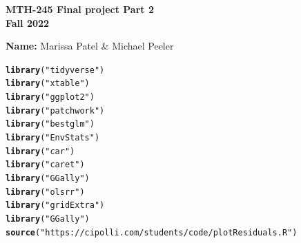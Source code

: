 \documentclass{article}\usepackage[]{graphicx}\usepackage[]{xcolor}
\makeatletter
\newcommand{\hlstr}[1]{\textcolor[rgb]{0.192,0.494,0.8}{#1}}%
\newcommand{\hlstd}[1]{\textcolor[rgb]{0.345,0.345,0.345}{#1}}%
\newcommand{\hlkwd}[1]{\textcolor[rgb]{0.737,0.353,0.396}{\textbf{#1}}}%
\newenvironment{kframe}{%
 \def\at@end@of@kframe{}%
 \ifinner\ifhmode%
  \def\at@end@of@kframe{\end{minipage}}%
  \begin{minipage}{\columnwidth}%
 \fi\fi%
 \def\FrameCommand##1{\hskip\@totalleftmargin \hskip-\fboxsep
 \colorbox{shadecolor}{##1}\hskip-\fboxsep
     \hskip-\linewidth \hskip-\@totalleftmargin \hskip\columnwidth}%
 \MakeFramed {\advance\hsize-\width
   \@totalleftmargin\z@ \linewidth\hsize
   \@setminipage}}%
 {\par\unskip\endMakeFramed%
 \at@end@of@kframe}
\newenvironment{knitrout}{}{} %
\makeatother
\begin{document}
\begin{center}
\textbf{MTH-245 Final project Part 2} \\
\textbf{Fall 2022}\\
\end{center}

\vspace{.3cm}

\textbf{Name: } Marissa Patel \& Michael Peeler 

\vspace{.3cm}

\begin{knitrout}
\color{fgcolor}\begin{kframe}
\begin{alltt}
\hlkwd{library}\hlstd{(}\hlstr{"tidyverse"}\hlstd{)}
\hlkwd{library}\hlstd{(}\hlstr{"xtable"}\hlstd{)}
\hlkwd{library}\hlstd{(}\hlstr{"ggplot2"}\hlstd{)}
\hlkwd{library}\hlstd{(}\hlstr{"patchwork"}\hlstd{)}
\hlkwd{library}\hlstd{(}\hlstr{"bestglm"}\hlstd{)}
\hlkwd{library}\hlstd{(}\hlstr{"EnvStats"}\hlstd{)}
\hlkwd{library}\hlstd{(}\hlstr{"car"}\hlstd{)}
\hlkwd{library}\hlstd{(}\hlstr{"caret"}\hlstd{)}
\hlkwd{library}\hlstd{(}\hlstr{"GGally"}\hlstd{)}
\hlkwd{library}\hlstd{(}\hlstr{"olsrr"}\hlstd{)}
\hlkwd{library}\hlstd{(}\hlstr{"gridExtra"}\hlstd{)}
\hlkwd{library}\hlstd{(}\hlstr{"GGally"}\hlstd{)}
\hlkwd{source}\hlstd{(}\hlstr{"https://cipolli.com/students/code/plotResiduals.R"}\hlstd{)}
\end{alltt}
\end{kframe}
\end{knitrout}
\end{document}
